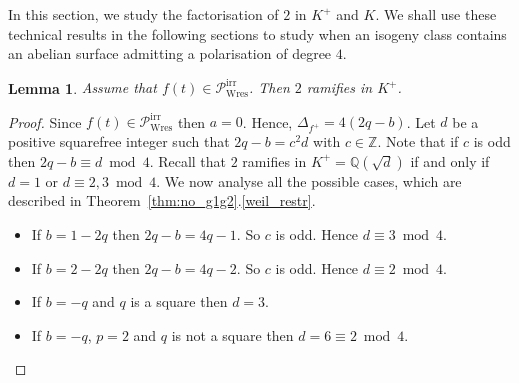 \documentclass[11pt]{amsart}
\newcommand\Q{\mathbb{Q}}
\newcommand\Z{\mathbb{Z}}
\theoremstyle{plain}
\newtheorem{lemma}[theorem]{Lemma}
\theoremstyle{definition}
\newcommand\PirrB{\mathcal{P}^\mathrm{irr}_\mathrm{Wres}}
\begin{document}
In this section, we study the factorisation of $2$ in $K^+$ and $K$. 
We shall use these technical results in the following sections to study when an isogeny class contains an abelian surface admitting a polarisation of degree $4$.

\begin{lemma}\label{lem:ram_ram}
    Assume that $f(t) \in \PirrB$. 
    Then $2$ ramifies in $K^+$.
\end{lemma}
\begin{proof}
    Since $f(t)\in \PirrB$ then $a=0$.
    Hence, $\Delta_{f^+} = 4(2q-b)$.
    Let $d$ be a positive squarefree integer such that $2q-b = c^2 d$ with $c\in \Z$.
    Note that if $c$ is odd then $2q-b \equiv d \bmod 4$.     Recall that $2$ ramifies in $K^+=\Q(\sqrt{d})$ if and only if $d=1$ or $d\equiv 2,3\bmod 4$.
    We now analyse all the possible cases, which are described in Theorem~\ref{thm:no_g1g2}.\ref{weil_restr}.
    \begin{itemize}
        \item If $b = 1-2q$ then $2q-b = 4q-1$. So $c$ is odd. Hence $d \equiv 3 \bmod 4$.
        \item If $b = 2-2q$ then $2q-b = 4q-2$. So $c$ is odd. Hence $d \equiv 2 \bmod 4$.
        \item If $b=-q$ and $q$ is a square then $d = 3$.
        \item If $b=-q$, $p=2$ and $q$ is not a square then $d=6 \equiv 2\bmod 4$.
    \end{itemize}
\end{proof}
\end{document}
